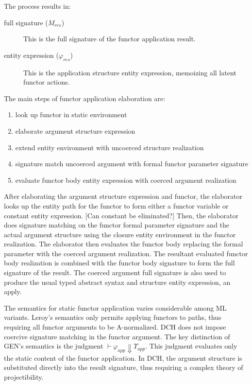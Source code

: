 The process results in:
\begin{description}
	\item[full signature ($M_{res}$)] This is the full signature of the functor application result. 
	\item[entity expression ($\varphi_{res}$)] This is the application structure entity expression, memoizing all latent functor actions. 
\end{description}

The main steps of functor application elaboration are:
\begin{enumerate}
	\item look up functor in static environment
	\item elaborate argument structure expression
	\item extend entity environment with uncoerced structure realization
	\item signature match uncoerced argument with formal functor parameter signature
	\item evaluate functor body entity expression with coerced argument realization 
\end{enumerate}
After elaborating the argument structure expression and functor, the elaborator looks up the entity path for the functor to form either a functor variable or constant entity expression. [Can constant be eliminated?] Then, the elaborator does signature matching on the functor formal parameter signature and the actual argument structure using the closure entity environment in the functor realization. The elaborator then evaluates the functor body replacing the formal parameter with the coerced argument realization. The resultant evaluated functor body realization is combined with the functor body signature to form the full signature of the result. The coerced argument full signature is also used to produce the usual typed abstract syntax and structure entity expression, an apply. 
                   
The semantics for static functor application varies considerable among ML variants. Leroy's semantics only permits applying functors to paths, thus requiring all functor arguments to be A-normalized. DCH does not impose coercive signature matching in the functor argument. The key distinction of GEN's semantics is the judgment $\vdash \varphi_{app} \Downarrow \Upsilon_{app}$. This judgment evaluates only the static content of the functor application. In DCH, the argument structure is substituted directly into the result signature, thus requiring a complex theory of projectibility. 
   
